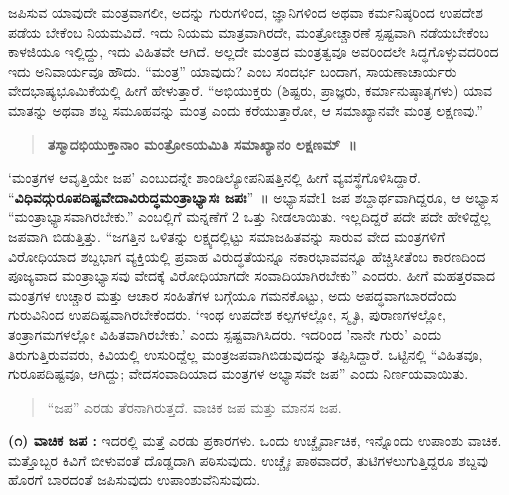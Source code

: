 {ಜಪಿಸುವ ಯಾವುದೇ ಮಂತ್ರವಾಗಲೀ, ಅದನ್ನು ಗುರುಗಳಿಂದ, ಜ್ಞಾನಿಗಳಿಂದ ಅಥವಾ ಕರ್ಮನಿಷ್ಠರಿಂದ ಉಪದೇಶ ಪಡೆಯ ಬೇಕೆಂಬ ನಿಯಮವಿದೆ. ಇದು ನಿಯಮ ಮಾತ್ರವಾಗಿರದೇ, ಮಂತ್ರೋಚ್ಚಾರಣೆ ಸ್ಪಷ್ಟವಾಗಿ ನಡೆಯಬೇಕೆಂಬ ಕಾಳಜಿಯೂ ಇಲ್ಲಿದ್ದು, ಇದು ವಿಹಿತವೇ ಆಗಿದೆ. ಅಲ್ಲದೇ ಮಂತ್ರದ ಮಂತ್ರತ್ವವೂ ಅವ\-ರಿಂದಲೇ ಸಿದ್ಧಗೊಳ್ಳುವದರಿಂದ ಇದು ಅನಿವಾರ್ಯವೂ ಹೌದು. “ಮಂತ್ರ” ಯಾವುದು? ಎಂಬ ಸಂದರ್ಭ ಬಂದಾಗ, ಸಾಯಣಾಚಾರ್ಯರು ವೇದಭಾಷ್ಯಭೂಮಿಕೆಯಲ್ಲಿ ಹೀಗೆ ಹೇಳುತ್ತಾರೆ. “ಅಭಿಯುಕ್ತರು (ಶಿಷ್ಟರು, ಪ್ರಾಜ್ಞರು, ಕರ್ಮಾನುಷ್ಠಾತೃಗಳು) ಯಾವ ಮಾತನ್ನು ಅಥವಾ ಶಬ್ದ ಸಮೂಹವನ್ನು ಮಂತ್ರ ಎಂದು ಕರೆಯುತ್ತಾರೋ, ಆ ಸಮಾಖ್ಯಾನವೇ ಮಂತ್ರ ಲಕ್ಷಣವು.” 
\begin{verse}
\textbf{ತಸ್ಮಾದಭಿಯುಕ್ತಾನಾಂ ಮಂತ್ರೋಽಯಮಿತಿ ಸಮಾಖ್ಯಾನಂ ಲಕ್ಷಣಮ್~॥}
\end{verse}
‘ಮಂತ್ರಗಳ ಆವೃತ್ತಿಯೇ ಜಪ’ ಎಂಬುದನ್ನೇ ಶಾಂಡಿಲ್ಯೋಪನಿಷತ್ತಿನಲ್ಲಿ ಹೀಗೆ ವ್ಯವಸ್ಥೆ\-ಗೊಳಿಸಿದ್ದಾರೆ. “\textbf{ವಿಧಿವದ್ಗು\-ರೂಪದಿಷ್ಟವೇದಾವಿರುದ್ಧಮಂತ್ರಾಭ್ಯಾಸಃ ಜಪಃ}”~॥ ಅಭ್ಯಾಸವೇ1 ಜಪ ಶಬ್ದಾರ್ಥವಾಗಿದ್ದರೂ, ಆ ಅಭ್ಯಾಸ “ಮಂತ್ರಾಭ್ಯಾಸವಾಗಿರಬೇಕು.” ಎಂಬಲ್ಲಿಗೆ ಮನ್ನಣೆಗೆ 2 ಒತ್ತು ನೀಡಲಾಯಿತು. ಇಲ್ಲದಿದ್ದರೆ ಪದೇ ಪದೇ ಹೇಳಿದ್ದೆಲ್ಲ ಜಪವಾಗಿ ಬಿಡುತ್ತಿತ್ತು. “ಜಗತ್ತಿನ ಒಳಿತನ್ನು ಲಕ್ಷ್ಯದಲ್ಲಿಟ್ಟು ಸಮಾಜಹಿತವನ್ನು ಸಾರುವ ವೇದ ಮಂತ್ರಗಳಿಗೆ ವಿರೋಧಿಯಾದ ಶಬ್ದಭಾಗ ವ್ಯಕ್ತಿಯಲ್ಲಿ ಪ್ರವಾಹ ವಿರುದ್ಧತೆಯನ್ನೂ ನಕಾರ\-ಭಾವವನ್ನೂ ಹೆಚ್ಚಿಸೀತೆಂಬ ಕಾರಣದಿಂದ ಪೂಜ್ಯವಾದ ಮಂತ್ರಾಭ್ಯಾಸವು ವೇದಕ್ಕೆ ವಿರೋಧಿಯಾಗದೇ ಸಂವಾದಿಯಾಗಿರಬೇಕು” ಎಂದರು. ಹೀಗೆ ಮಹತ್ತರವಾದ ಮಂತ್ರಗಳ ಉಚ್ಚಾರ ಮತ್ತು ಆಚಾರ ಸಂಹಿತೆಗಳ ಬಗ್ಗೆಯೂ ಗಮನಕೊಟ್ಟು, ಅದು ಅಪದ್ಧ\-ವಾಗಬಾರದೆಂದು ಗುರುವಿನಿಂದ ಉಪದಿಷ್ಟವಾಗಿರಬೇಕೆಂದರು. ‘ಇಂಥ ಉಪದೇಶ ಕಲ್ಪಗಳಲ್ಲೋ, ಸ್ಮೃತಿ, ಪುರಾಣಗಳಲ್ಲೋ, ತಂತ್ರಾಗಮಗಳಲ್ಲೋ ವಿಹಿತವಾಗಿರಬೇಕು.’ ಎಂದು ಸ್ಪಷ್ಟವಾಗಿಸಿದರು. ಇದರಿಂದ ’ನಾನೇ ಗುರು’ ಎಂದು ತಿರುಗುತ್ತಿರುವವರು, ಕಿವಿಯಲ್ಲಿ ಉಸುರಿದ್ದೆಲ್ಲ ಮಂತ್ರಜಪವಾಗಿಬಿಡುವುದನ್ನು ತಪ್ಪಿಸಿದ್ದಾರೆ. ಒಟ್ಟಿನಲ್ಲಿ “ವಿಹಿತವೂ, ಗುರೂಪದಿಷ್ಟವೂ, ಆಗಿದ್ದು; ವೇದಸಂವಾದಿಯಾದ ಮಂತ್ರಗಳ ಅಭ್ಯಾಸವೇ ಜಪ” ಎಂದು ನಿರ್ಣಯವಾಯಿತು.
\begin{verse}
“ಜಪ” ಎರಡು ತೆರನಾಗಿರುತ್ತದೆ. ವಾಚಿಕ ಜಪ ಮತ್ತು ಮಾನಸ ಜಪ.
\end{verse}
\textbf{(೧) ವಾಚಿಕ ಜಪ :} ಇದರಲ್ಲಿ ಮತ್ತೆ ಎರಡು ಪ್ರಕಾರಗಳು. ಒಂದು ಉಚ್ಚೈರ್ವಾಚಿಕ, ಇನ್ನೊಂದು ಉಪಾಂಶು ವಾಚಿಕ. ಮತ್ತೊಬ್ಬರ ಕಿವಿಗೆ ಬೀಳುವಂತೆ ದೊಡ್ಡದಾಗಿ ಪಠಿಸುವುದು. ಉಚ್ಚೈಃ ಪಾಠವಾದರೆ, ತುಟಿಗಳಲುಗುತ್ತಿದ್ದರೂ ಶಬ್ದವು ಹೊರಗೆ ಬಾರದಂತೆ ಜಪಿಸುವುದು ಉಪಾಂಶುವೆನಿಸುವುದು.

}
